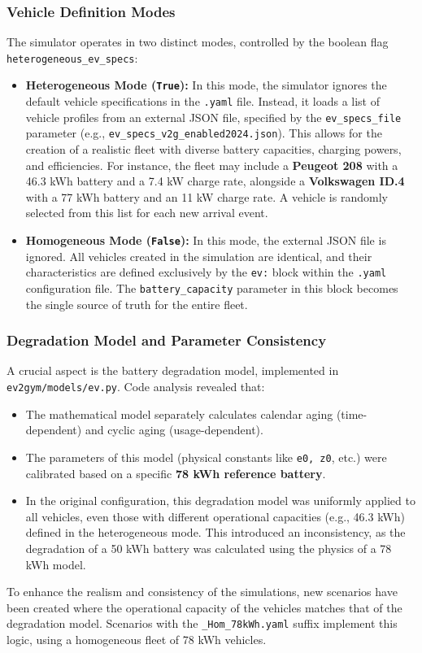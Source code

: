 \subsubsection{Vehicle Definition Modes}
The simulator operates in two distinct modes, controlled by the boolean flag \texttt{heterogeneous\_ev\_specs}:
\begin{itemize}
    \item \textbf{Heterogeneous Mode (\texttt{True}):} In this mode, the simulator ignores the default vehicle specifications in the \texttt{.yaml} file. Instead, it loads a list of vehicle profiles from an external JSON file, specified by the \texttt{ev\_specs\_file} parameter (e.g., \texttt{ev\_specs\_v2g\_enabled2024.json}). This allows for the creation of a realistic fleet with diverse battery capacities, charging powers, and efficiencies. For instance, the fleet may include a \textbf{Peugeot 208} with a 46.3 kWh battery and a 7.4 kW charge rate, alongside a \textbf{Volkswagen ID.4} with a 77 kWh battery and an 11 kW charge rate. A vehicle is randomly selected from this list for each new arrival event.
    \item \textbf{Homogeneous Mode (\texttt{False}):} In this mode, the external JSON file is ignored. All vehicles created in the simulation are identical, and their characteristics are defined exclusively by the \texttt{ev:} block within the \texttt{.yaml} configuration file. The \texttt{battery\_capacity} parameter in this block becomes the single source of truth for the entire fleet.
\end{itemize}

\subsubsection{Degradation Model and Parameter Consistency}
A crucial aspect is the battery degradation model, implemented in \texttt{ev2gym/models/ev.py}. Code analysis revealed that:
\begin{itemize}
    \item The mathematical model separately calculates calendar aging (time-dependent) and cyclic aging (usage-dependent).
    \item The parameters of this model (physical constants like \texttt{e0, z0}, etc.) were calibrated based on a specific \textbf{78 kWh reference battery}.
    \item In the original configuration, this degradation model was uniformly applied to all vehicles, even those with different operational capacities (e.g., 46.3 kWh) defined in the heterogeneous mode. This introduced an inconsistency, as the degradation of a 50 kWh battery was calculated using the physics of a 78 kWh model.
\end{itemize}
To enhance the realism and consistency of the simulations, new scenarios have been created where the operational capacity of the vehicles matches that of the degradation model. Scenarios with the \texttt{\_Hom\_78kWh.yaml} suffix implement this logic, using a homogeneous fleet of 78 kWh vehicles.


